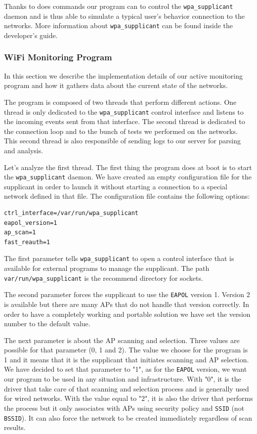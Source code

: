 Thanks to does commands our program can to control the \texttt{wpa\_supplicant} daemon and is thus able to simulate a typical user's behavior connection to the networks. More information about \texttt{wpa\_supplicant} can be found inside the developer's guide\cite{wpa-supplicant-devel}.


\subsubsection{WiFi Monitoring Program}
In this section we describe the implementation details of our active monitoring program and how it gathers data about the current state of the networks.

The program is composed of two threads that perform different actions. One thread is only dedicated to the \texttt{wpa\_supplicant} control interface and listens to the incoming events sent from that interface. The second thread is dedicated to the connection loop and to the bunch of tests we performed on the networks. This second thread is also responsible of sending logs to our server for parsing and analysis.

Let's analyze the first thread. The first thing the program does at boot is to start the \texttt{wpa\_supplicant} daemon. We have created an empty configuration file for the supplicant in order to launch it without starting a connection to a special network defined in that file. The configuration file contains the following options:\\

\begin{lstlisting}[frame=single,breaklines=true,caption={\texttt{wpa\_supplicant.conf}}]
ctrl_interface=/var/run/wpa_supplicant
eapol_version=1
ap_scan=1
fast_reauth=1
\end{lstlisting}
\par The first parameter tells \texttt{wpa\_supplicant} to open a control interface that is available for external programs to manage the supplicant. The path \texttt{var/run/wpa\_supplicant} is the recommend directory for sockets. 

The second parameter forces the supplicant to use the \texttt{EAPOL} version 1. Version 2 is available but there are many APs that do not handle that version correctly. In order to have a completely working and portable solution we have set the version number to the default value.

The next parameter is about the AP scanning and selection. Three values are possible for that parameter (0, 1 and 2). The value we choose for the program is 1 and it means that it is the supplicant that initiates scanning and AP selection. We have decided to set that parameter to "1", as for the \texttt{EAPOL} version, we want our program to be used in any situation and infrastructure. With "0", it is the driver that take care of that scanning and selection process and is generally used for wired networks. With the value equal to "2", it is also the driver that performs the process but it only associates with APs using security policy and \texttt{SSID} (not \texttt{BSSID}). It can also force the network to be created immediately regardless of scan results.

